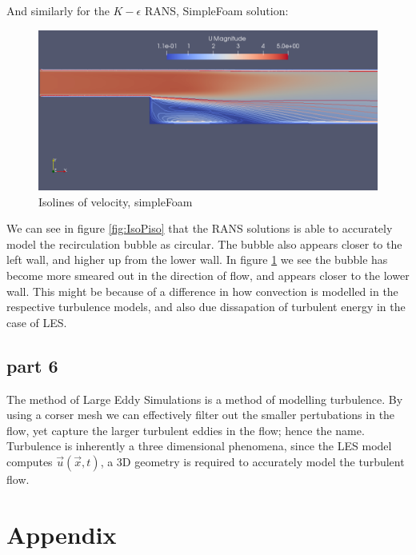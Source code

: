 \documentclass[paper=a4, fontsize=11pt]{article} %
\numberwithin{equation}{section} %
\numberwithin{figure}{section} %
\numberwithin{table}{section} %
\begin{document}
    And similarly for the $K-\epsilon$ RANS, SimpleFoam solution:

    \begin{figure}[h!]
        \centering
        \includegraphics[width=0.6\linewidth]{Figures/isolines_U_mag_simpleFoam}
        \caption{Isolines of velocity, simpleFoam}
        \label{fig:IsoSimple}
    \end{figure}

    We can see in figure \ref{fig:IsoPiso} that the RANS solutions is able to accurately model the recirculation bubble as circular. The bubble also appears closer to the left wall, and higher up from the lower wall. In figure \ref{fig:IsoSimple} we see the bubble has become more smeared out in the direction of flow, and appears closer to the lower wall. This might be because of a difference in how convection is modelled in the respective turbulence models, and also due dissapation of turbulent energy in the case of LES.

    \subsection*{part 6}
    The method of Large Eddy Simulations is a method of modelling turbulence. By using a corser mesh we can effectively filter out the smaller pertubations in the flow, yet capture the larger turbulent eddies in the flow; hence the name. Turbulence is inherently a three dimensional phenomena, since the LES model computes $\overrightarrow{u}(\overrightarrow{x}, t)$, a 3D geometry is required to accurately model the turbulent flow.
    \clearpage
    \section{Appendix}
\end{document}
